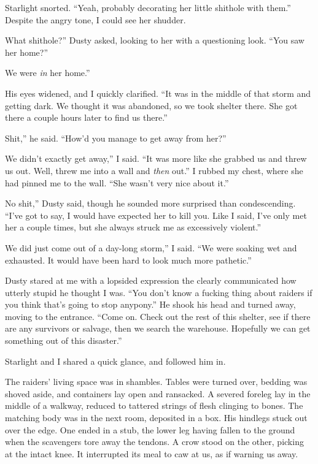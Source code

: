 Starlight snorted. “Yeah, probably decorating her little shithole with them.” Despite the angry tone, I could see her shudder.

\leavevmode{}What shithole?” Dusty asked, looking to her with a questioning look. “You saw her home?”

\leavevmode{}We were \textit{in} her home.”

His eyes widened, and I quickly clarified. “It was in the middle of that storm and getting dark. We thought it was abandoned, so we took shelter there. She got there a couple hours later to find us there.”

\leavevmode{}Shit,” he said. “How’d you manage to get away from her?”

\leavevmode{}We didn’t exactly get away,” I said. “It was more like she grabbed us and threw us out. Well, threw me into a wall and \textit{then} out.” I rubbed my chest, where she had pinned me to the wall. “She wasn’t very nice about it.”

\leavevmode{}No shit,” Dusty said, though he sounded more surprised than condescending. “I’ve got to say, I would have expected her to kill you. Like I said, I’ve only met her a couple times, but she always struck me as excessively violent.”

\leavevmode{}We did just come out of a day-long storm,” I said. “We were soaking wet and exhausted. It would have been hard to look much more pathetic.”

Dusty stared at me with a lopsided expression the clearly communicated how utterly stupid he thought I was. “You don’t know a fucking thing about raiders if you think that’s going to stop anypony.” He shook his head and turned away, moving to the entrance. “Come on. Check out the rest of this shelter, see if there are any survivors or salvage, then we search the warehouse. Hopefully we can get something out of this disaster.”

Starlight and I shared a quick glance, and followed him in.

The raiders’ living space was in shambles. Tables were turned over, bedding was shoved aside, and containers lay open and ransacked. A severed foreleg lay in the middle of a walkway, reduced to tattered strings of flesh clinging to bones. The matching body was in the next room, deposited in a box. His hindlegs stuck out over the edge. One ended in a stub, the lower leg having fallen to the ground when the scavengers tore away the tendons. A crow stood on the other, picking at the intact knee. It interrupted its meal to caw at us, as if warning us away.

